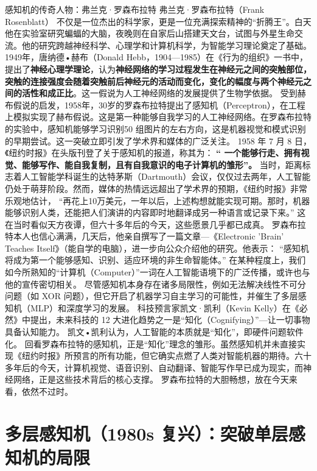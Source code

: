 \begin{story}{感知机的传奇人物：弗兰克·罗森布拉特}
弗兰克·罗森布拉特（Frank Rosenblatt） 不仅是一位杰出的科学家，更是一位充满探索精神的“折腾王”。白天他在实验室研究蝙蝠的大脑，夜晚则在自家后山搭建天文台，试图与外星生命交流。他的研究跨越神经科学、心理学和计算机科学，为智能学习理论奠定了基础。
1949年，唐纳德•赫布（Donald Hebb，1904—1985）在《行为的组织》一书中，提出了{\bf 神经心理学理论}，认为{\bf 神经网络的学习过程发生在神经元之间的突触部位，突触的连接强度会随着突触前后神经元的活动而变化，变化的幅度与两个神经元之间的活性和成正比}。这一假说为人工神经网络的发展提供了生物学依据。
受到赫布假说的启发，1958年，30岁的罗森布拉特提出了感知机（Perceptron），在工程上模拟实现了赫布假说。这是第一种能够自我学习的人工神经网络。在罗森布拉特的实验中，感知机能够学习识别50 组图片的左右方向，这是机器视觉和模式识别的早期尝试。这一突破立即引发了学术界和媒体的广泛关注。
1958 年 7 月 8 日，《纽约时报》在头版刊登了关于感知机的报道，称其为：
{\bf“ 一个能够行走、拥有视觉、能够写作、能自我复制，且有自我意识的电子计算机的雏形”。}
当时，距离标志着人工智能学科诞生的达特茅斯（Dartmouth）会议，仅仅过去两年，人工智能仍处于萌芽阶段。然而，媒体的热情远远超出了学术界的预期，《纽约时报》非常乐观地估计，
“再花上10万美元，一年以后，上述构想就能实现可期。那时，机器能够识别人类，还能把人们演讲的内容即时地翻译成另一种语言或记录下来。”
这在当时看似天方夜谭，但六十多年后的今天，这些愿景几乎都已成真。
罗森布拉特本人也信心满满，几天后，他亲自撰写了一篇文章---《Electronic 'Brain' Teaches Itself》（能自学的电脑），进一步向公众介绍他的研究。他表示：
“感知机将成为第一个能够感知、识别、适应环境的非生命智能体。”
在某种程度上，我们如今所熟知的“计算机（Computer）”一词在人工智能语境下的广泛传播，或许也与他的宣传密切相关。
尽管感知机本身存在诸多局限性，例如无法解决线性不可分问题（如 XOR 问题），但它开启了机器学习自主学习的可能性，并催生了多层感知机（MLP）和深度学习的发展。
科技预言家凯文·凯利（Kevin Kelly）在《必然》中提出，未来科技的 12 大进化趋势之一是“知化（Cognifying）”---让一切事物具备认知能力。
凯文•凯利认为，人工智能的本质就是“知化”，即硬件问题软件化。
回看罗森布拉特的感知机，正是“知化”理念的雏形。虽然感知机并未直接实现《纽约时报》所预言的所有功能，但它确实点燃了人类对智能机器的期待。六十多年后的今天，计算机视觉、语音识别、自动翻译、智能写作早已成为现实，而神经网络，正是这些技术背后的核心支撑。
罗森布拉特的大胆畅想，放在今天来看，依然不过时。
\end{story}
\section{ 多层感知机（1980s 复兴）：突破单层感知机的局限}

